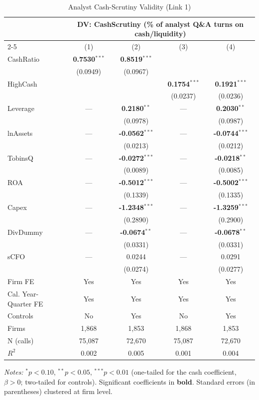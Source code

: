 \begin{table}[htbp]
\centering
\caption{Analyst Cash-Scrutiny Validity (Link 1)}
\label{tab:cash_scrutiny_validity}
\scriptsize
\begin{tabular}{lcccc}
\toprule
& \multicolumn{4}{c}{DV: CashScrutiny (\% of analyst Q\&A turns on cash/liquidity)} \\
\cmidrule(lr){2-5}
 & (1) & (2) & (3) & (4) \\
\midrule
CashRatio & \textbf{0.7530}$^{***}$ & \textbf{0.8519}$^{***}$ &  &  \\
 & (0.0949) & (0.0967) &  &  \\
HighCash &  &  & \textbf{0.1754}$^{***}$ & \textbf{0.1921}$^{***}$ \\
 &  &  & (0.0237) & (0.0236) \\
\midrule
Leverage & --- & \textbf{0.2180}$^{**}$ & --- & \textbf{0.2030}$^{**}$ \\
 &  & (0.0978) &  & (0.0987) \\
lnAssets & --- & \textbf{-0.0562}$^{***}$ & --- & \textbf{-0.0744}$^{***}$ \\
 &  & (0.0213) &  & (0.0212) \\
TobinsQ & --- & \textbf{-0.0272}$^{***}$ & --- & \textbf{-0.0218}$^{**}$ \\
 &  & (0.0089) &  & (0.0085) \\
ROA & --- & \textbf{-0.5012}$^{***}$ & --- & \textbf{-0.5002}$^{***}$ \\
 &  & (0.1339) &  & (0.1335) \\
Capex & --- & \textbf{-1.2348}$^{***}$ & --- & \textbf{-1.3259}$^{***}$ \\
 &  & (0.2890) &  & (0.2900) \\
DivDummy & --- & \textbf{-0.0674}$^{**}$ & --- & \textbf{-0.0678}$^{**}$ \\
 &  & (0.0331) &  & (0.0331) \\
sCFO & --- & 0.0244 & --- & 0.0291 \\
 &  & (0.0274) &  & (0.0277) \\
\midrule
Firm FE & Yes & Yes & Yes & Yes \\
Cal. Year-Quarter FE & Yes & Yes & Yes & Yes \\
Controls & No & Yes & No & Yes \\
\midrule
Firms & 1,868 & 1,853 & 1,868 & 1,853 \\
N (calls) & 75,087 & 72,670 & 75,087 & 72,670 \\
$R^2$ & 0.002 & 0.005 & 0.001 & 0.004 \\
\bottomrule
\end{tabular}
\begin{minipage}{\linewidth}
\vspace{2pt}\scriptsize
\textit{Notes:} $^{*}p<0.10$, $^{**}p<0.05$, $^{***}p<0.01$ (one-tailed for the cash coefficient, $\beta>0$; two-tailed for controls).
Significant coefficients in \textbf{bold}.
Standard errors (in parentheses) clustered at firm level.
\end{minipage}
\end{table}
